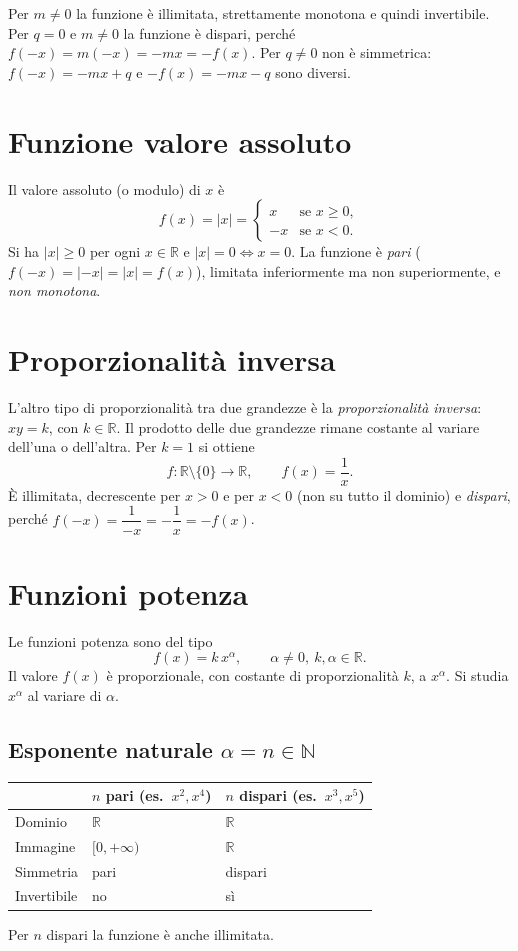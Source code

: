 \documentclass[11pt,a4paper]{article}
\begin{document}
Per $m \ne 0$ la funzione è illimitata, strettamente monotona e quindi invertibile. Per $q = 0$ e $m \neq 0$ la funzione è dispari, perché $f(-x) = m(-x) = -mx = -f(x)$. Per $q \ne 0$ non è simmetrica: $f(-x) = -mx + q$ e $-f(x) = -mx - q$ sono diversi.

\section{Funzione valore assoluto}

Il valore assoluto (o modulo) di $x$ è
\[
f(x) = |x| =
\begin{cases}
x & \text{se } x \ge 0, \\
-x & \text{se } x < 0.
\end{cases}
\]
Si ha $|x| \ge 0$ per ogni $x \in \mathbb{R}$ e $|x| = 0 \iff x = 0$. La funzione è \emph{pari} ($f(-x) = |-x| = |x| = f(x)$), limitata inferiormente ma non superiormente, e \emph{non monotona}.

\section{Proporzionalità inversa}

L'altro tipo di proporzionalità tra due grandezze è la \emph{proporzionalità inversa}: $xy = k$, con $k \in \mathbb{R}$. Il prodotto delle due grandezze rimane costante al variare dell'una o dell'altra. Per $k = 1$ si ottiene
\[
f : \mathbb{R} \setminus \{0\} \to \mathbb{R}, \qquad f(x) = \frac{1}{x}.
\]
È illimitata, decrescente per $x > 0$ e per $x < 0$ (non su tutto il dominio) e \emph{dispari}, perché $f(-x) = \dfrac{1}{-x} = -\dfrac{1}{x} = -f(x)$.

\section{Funzioni potenza}

Le funzioni potenza sono del tipo
\[
f(x) = k\,x^{\alpha}, \qquad \alpha \ne 0,\ k, \alpha \in \mathbb{R}.
\]
Il valore $f(x)$ è proporzionale, con costante di proporzionalità $k$, a $x^\alpha$. Si studia $x^\alpha$ al variare di $\alpha$.

\subsection*{Esponente naturale $\alpha = n \in \mathbb{N}$}

\begin{center}
\renewcommand{\arraystretch}{1.3}
\begin{tabular}{@{}lll@{}}
\toprule
 & $n$ pari (es.\ $x^2, x^4$) & $n$ dispari (es.\ $x^3, x^5$) \\
\midrule
Dominio & $\mathbb{R}$ & $\mathbb{R}$ \\
Immagine & $[0,+\infty)$ & $\mathbb{R}$ \\
Simmetria & pari & dispari \\
Invertibile & no & sì \\
\bottomrule
\end{tabular}
\end{center}
Per $n$ dispari la funzione è anche illimitata.
\end{document}
